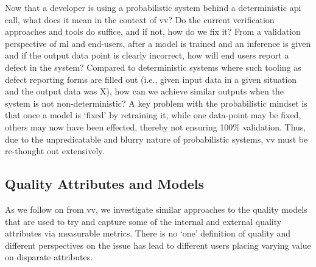 Now that a developer is using  a probabilistic system behind a deterministic \gls{api} call, what does it mean in the context of \gls{vv}? Do the current verification approaches and tools do suffice, and if not, how do we fix it? From a validation perspective of \gls{ml} and end-users, after a model is trained and an inference is given and if the output data point is clearly incorrect, how will end users report a defect in the system? Compared to deterministic systems where such tooling as defect reporting forms are filled out (i.e., given input data in a given situation and the output data was X), how can we achieve similar outputs when the system is not non-deterministic? A key problem with the probabilistic mindset is that once a model is `fixed' by retraining it, while one data-point may be fixed, others may now have been effected, thereby not ensuring 100\% validation. Thus, due to the unpredicatable and blurry nature of probabilistic systems, \gls{vv} must be re-thought out extensively.

\subsection{Quality Attributes and Models}

As we follow on from \gls{vv}, we investigate similar approaches to the quality models that are used to try and capture some of the internal and external quality attributes via measurable metrics. There is no `one' definition of quality and different perspectives on the issue has lead to different users placing varying value on disparate attributes.



